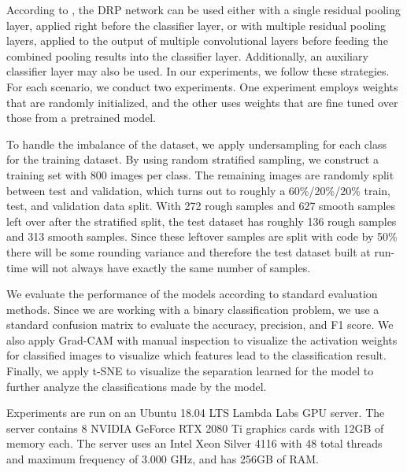 \documentclass{aci}
\numberwithin{equation}{section}
\begin{document}
According to \cite{mao_deep_2021}, the DRP network can be used either with a
single residual pooling layer, applied right before the classifier layer, or
with multiple residual pooling layers, applied to the output of multiple
convolutional layers before feeding the combined pooling results into the
classifier layer. Additionally, an auxiliary classifier layer may also be used.
In our experiments, we follow these strategies. For each scenario, we conduct
two experiments. One experiment employs weights that are randomly initialized,
and the other uses weights that are fine tuned over those from a pretrained
model.

To handle the imbalance of the dataset, we apply undersampling for each class for
the training dataset. By using random stratified sampling, we construct a
training set with 800 images per class. The remaining images are randomly split
between test and validation, which turns out to roughly a 60\%/20\%/20\% train,
test, and validation data split. With 272 rough samples and 627 smooth samples
left over after the stratified split, the test dataset has roughly 136 rough
samples and 313 smooth samples. Since these leftover samples are split with code
by 50\% there will be some rounding variance and therefore the test dataset
built at run-time will not always have exactly the same number of samples.


We evaluate the performance of the models according to standard evaluation
methods. Since we are working with a binary classification problem, we use a
standard confusion matrix to evaluate the accuracy, precision, and F1 score. We
also apply Grad-CAM with manual inspection to visualize the activation weights
for classified images to visualize which features lead to the classification
result. Finally, we apply t-SNE to visualize the separation learned for the
model to further analyze the classifications made by the model.


Experiments are run on an Ubuntu 18.04 LTS Lambda Labs GPU server. The server
contains 8 NVIDIA GeForce RTX 2080 Ti graphics cards with 12GB of memory each.
The server uses an Intel Xeon Silver 4116 with 48 total threads and maximum
frequency of 3.000 GHz, and has 256GB of RAM.
\end{document}
